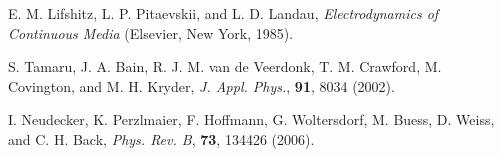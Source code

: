 \documentclass{article}
\begin{document}
\begin{thebibliography}{99}

E. M. Lifshitz, L. P. Pitaevskii, and L. D. Landau,
{\it Electrodynamics of Continuous Media}
(Elsevier, New York, 1985).

S. Tamaru, J. A. Bain, R. J. M. van de Veerdonk, T. M. Crawford, M. Covington, and M. H. Kryder, 
{\it J. Appl. Phys.}, {\bf 91}, 8034 (2002).

I. Neudecker, K. Perzlmaier, F. Hoffmann, G. Woltersdorf, M. Buess, D. Weiss, and C. H. Back, 
{\it Phys. Rev. B}, {\bf 73}, 134426 (2006).


\end{thebibliography}
\end{document}
